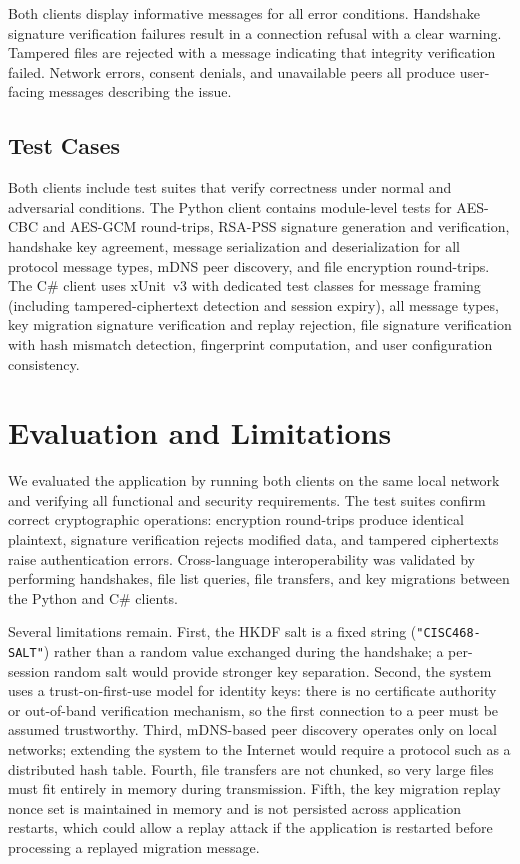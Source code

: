 \documentclass[sigconf,nonacm]{acmart}
\begin{document}
Both clients display informative messages for all error conditions.
Handshake signature verification failures result in a connection refusal with a clear warning.
Tampered files are rejected with a message indicating that integrity verification failed.
Network errors, consent denials, and unavailable peers all produce user-facing messages describing the issue.

\subsection{Test Cases}

Both clients include test suites that verify correctness under normal and adversarial conditions.
The Python client contains module-level tests for AES-CBC and AES-GCM round-trips, RSA-PSS signature generation and verification, handshake key agreement, message serialization and deserialization for all protocol message types, mDNS peer discovery, and file encryption round-trips.
The C\# client uses xUnit~v3 with dedicated test classes for message framing (including tampered-ciphertext detection and session expiry), all message types, key migration signature verification and replay rejection, file signature verification with hash mismatch detection, fingerprint computation, and user configuration consistency.


\section{Evaluation and Limitations}
\label{sec:evaluation}

We evaluated the application by running both clients on the same local network and verifying all functional and security requirements.
The test suites confirm correct cryptographic operations: encryption round-trips produce identical plaintext, signature verification rejects modified data, and tampered ciphertexts raise authentication errors.
Cross-language interoperability was validated by performing handshakes, file list queries, file transfers, and key migrations between the Python and C\# clients.

Several limitations remain.
First, the HKDF salt is a fixed string (\texttt{"CISC468-SALT"}) rather than a random value exchanged during the handshake; a per-session random salt would provide stronger key separation.
Second, the system uses a trust-on-first-use model for identity keys: there is no certificate authority or out-of-band verification mechanism, so the first connection to a peer must be assumed trustworthy.
Third, mDNS-based peer discovery operates only on local networks; extending the system to the Internet would require a protocol such as a distributed hash table.
Fourth, file transfers are not chunked, so very large files must fit entirely in memory during transmission.
Fifth, the key migration replay nonce set is maintained in memory and is not persisted across application restarts, which could allow a replay attack if the application is restarted before processing a replayed migration message.
\end{document}
